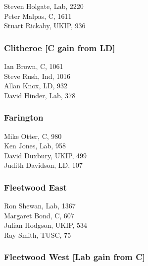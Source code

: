 \documentclass[a4paper,openany,10pt]{book}
\begin{document}
Steven Holgate, Lab, 2220\\
Peter Malpas, C, 1611\\
Stuart Rickaby, UKIP, 936\\


\subsubsection*{Clitheroe \hspace*{\fill}\nolinebreak[1]%
\enspace\hspace*{\fill}
[C gain from LD]}



Ian Brown, C, 1061\\
Steve Rush, Ind, 1016\\
Allan Knox, LD, 932\\
David Hinder, Lab, 378\\


\subsubsection*{Farington}



Mike Otter, C, 980\\
Ken Jones, Lab, 958\\
David Duxbury, UKIP, 499\\
Judith Davidson, LD, 107\\


\subsubsection*{Fleetwood East}



Ron Shewan, Lab, 1367\\
Margaret Bond, C, 607\\
Julian Hodgson, UKIP, 534\\
Ray Smith, TUSC, 75\\


\subsubsection*{Fleetwood West \hspace*{\fill}\nolinebreak[1]%
\enspace\hspace*{\fill}
[Lab gain from C]}
\end{document}
